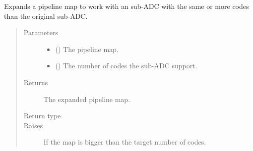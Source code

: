 \documentclass[letterpaper,10pt,english]{sphinxmanual}
\begin{document}
\begin{fulllineitems}
\label{\detokenize{gen:calib.gen.adjust_map}}
Expands a pipeline map to work with an sub-ADC with the same or more codes
than the original sub-ADC.
\begin{quote}\begin{description}
\item[{Parameters}] \leavevmode\begin{itemize}
\item {} 
 () \textendash{} The pipeline map.

\item {} 
 () \textendash{} The number of codes the sub-ADC support.

\end{itemize}

\item[{Returns}] \leavevmode
The expanded pipeline map.

\item[{Return type}] \leavevmode
{}

\item[{Raises}] \leavevmode
{} \textendash{} If the map is bigger than the target number of
codes.

\end{description}\end{quote}




{\hyperref[\detokenize{gen:calib.gen.pipe_map}]{}}



\end{fulllineitems}

\end{document}
